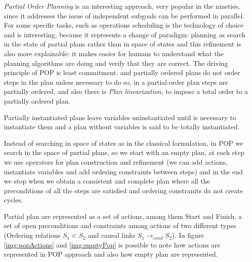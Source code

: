 \emph{Partial Order Planning} is an interesting approach, very popular in the nineties, since 
it addresses the issue of independent subgoals can be performed in parallel.\newline
For some specific tasks, such as operations scheduling is the technology of choice and is 
interesting, because it represents a change of paradigm: planning as search in the state of
partial plans rather than in space of states and this refinement is also more explainable:
it makes easier for humans to understand what the planning algorithms are doing and 
verify that they are correct.\newline
The driving principle of POP is least commitment, and partially ordered plans do not order steps
in the plan unless necessary to do so, in a partial-order plan steps are partially ordered, and
also there is \emph{Plan linearization}, to impose a total order to a partially ordered plan.

Partially instantiated plans leave variables uninstantiated until is necessary to instantiate them
and a plan without variables is said to be totally instantiated.

Instead of searching in space of states as in the classical formulation, in POP we search in the
space of partial plans, so we start with an empty plan, at each step we use operators for plan 
construction and refinement (we can add actions, instantiate variables and add ordering constraints
between steps) and in the end we stop when we obtain a consistent and complete plan where 
all the preconditions of all the steps are satisfied and ordering constranits do not create cycles.

Partial plan are represented as a set of actions, among them Start and Finish, a set of open
preconditions and constraints among actions of two different types (Ordering relations $S_1 < S_2$
and causal links $S_1 \to _{cond} S_2$).\newline
In figure \ref{img:popActions} and \ref{img:emptyPop} is possible to note how actions are 
represented in POP approach and also how empty plan are represented.

